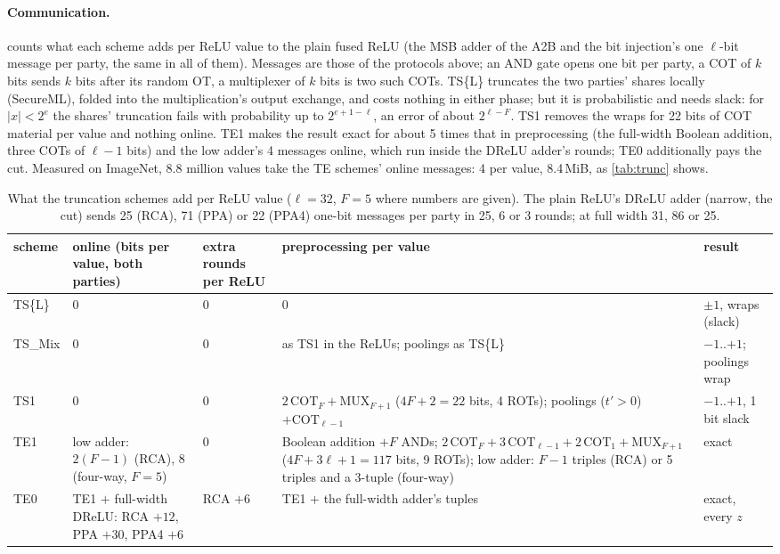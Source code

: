 \paragraph{Communication.}  counts what each scheme adds per ReLU value to the plain fused
ReLU (the MSB adder of the A2B and the bit injection's one $\ell$-bit message per party, the same in all of them).
Messages are those of the protocols above; an AND gate opens one bit per party, a COT of $k$ bits sends $k$ bits after
its random OT, a multiplexer of $k$ bits is two such COTs. TS\{L\} truncates the two parties' shares locally (SecureML), folded into
the multiplication's output exchange, and costs nothing in either phase; but it is probabilistic and needs slack:
for $|x| < 2^e$ the shares' truncation fails with probability up to $2^{e+1-\ell}$, an error of about $2^{\ell-F}$. TS1 removes the wraps for 22 bits of COT material per value
and nothing online. TE1 makes the result exact for about 5 times that in preprocessing (the full-width Boolean
addition, three COTs of $\ell - 1$ bits) and the low adder's 4 messages online, which run inside the DReLU adder's
rounds; TE0 additionally pays the cut. Measured on ImageNet, $8.8$ million values take the TE schemes' online
messages: 4 per value, 8.4\,MiB, as \cref{tab:trunc} shows.

\begin{table}[t]
\centering\small
\begin{tabular}{@{}lp{3.0cm}p{1.6cm}p{5.6cm}l@{}}
\toprule
scheme & online (bits per value, both parties) & extra rounds per ReLU & preprocessing per value & result\\
\midrule
TS\{L\} & 0 & 0 & 0 & $\pm 1$, wraps (slack)\\
TS\_Mix & 0 & 0 & as TS1 in the ReLUs; poolings as TS\{L\} & $-1$..$+1$; poolings wrap\\
TS1 & 0 & 0 & $2\,\mathrm{COT}_F + \mathrm{MUX}_{F+1}$ ($4F + 2 = 22$ bits, 4 ROTs); poolings ($t' > 0$) $+\mathrm{COT}_{\ell-1}$ & $-1$..$+1$, 1 bit slack\\
TE1 & low adder: $2(F - 1)$ (RCA), 8 (four-way, $F = 5$) & 0 & Boolean addition $+F$ ANDs; $2\,\mathrm{COT}_F + 3\,\mathrm{COT}_{\ell-1} + 2\,\mathrm{COT}_1 + \mathrm{MUX}_{F+1}$ ($4F + 3\ell + 1 = 117$ bits, 9 ROTs); low adder: $F - 1$ triples (RCA) or 5 triples and a 3-tuple (four-way) & exact\\
TE0 & TE1 $+$ full-width DReLU: RCA $+12$, PPA $+30$, PPA4 $+6$ & RCA $+6$ & TE1 $+$ the full-width adder's tuples & exact, every $z$\\
\bottomrule
\end{tabular}
\caption{What the truncation schemes add per ReLU value ($\ell = 32$, $F = 5$ where numbers are given). The plain
ReLU's DReLU adder (narrow, the cut) sends 25 (RCA), 71 (PPA) or 22 (PPA4) one-bit messages per party in 25, 6 or 3
rounds; at full width 31, 86 or 25.}
\label{tab:trunccost}
\end{table}

